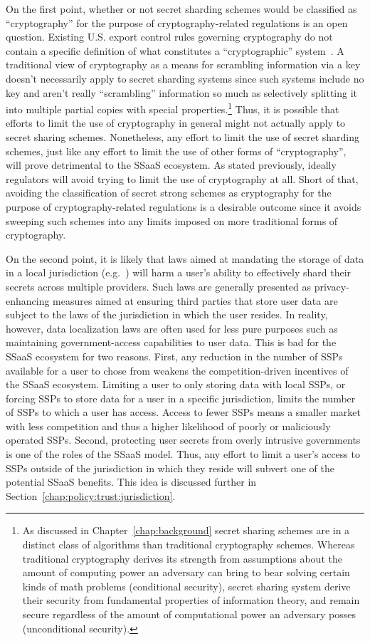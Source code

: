 On the first point, whether or not secret sharding schemes would be
classified as ``cryptography'' for the purpose of cryptography-related
regulations is an open question. Existing U.S. export control rules
governing cryptography do not contain a specific definition of what
constitutes a ``cryptographic'' system~\cite{bis-encrypted}. A
traditional view of cryptography as a means for scrambling information
via a key doesn't necessarily apply to secret sharding systems since
such systems include no key and aren't really ``scrambling''
information so much as selectively splitting it into multiple partial
copies with special properties.\footnote{As discussed in
  Chapter~\ref{chap:background} secret sharing schemes are in a
  distinct class of algorithms than traditional cryptography
  schemes. Whereas traditional cryptography derives its strength from
  assumptions about the amount of computing power an adversary can
  bring to bear solving certain kinds of math problems (conditional
  security), secret sharing system derive their security from
  fundamental properties of information theory, and remain secure
  regardless of the amount of computational power an adversary posses
  (unconditional security).} Thus, it is possible that efforts to
limit the use of cryptography in general might not actually apply to
secret sharing schemes. Nonetheless, any effort to limit the use of
secret sharding schemes, just like any effort to limit the use of
other forms of ``cryptography'', will prove detrimental to the SSaaS
ecosystem. As stated previously, ideally regulators will avoid trying
to limit the use of cryptography at all. Short of that, avoiding the
classification of secret strong schemes as cryptography for the
purpose of cryptography-related regulations is a desirable outcome
since it avoids sweeping such schemes into any limits imposed on more
traditional forms of cryptography.

On the second point, it is likely that laws aimed at mandating the
storage of data in a local jurisdiction (e.g.~\cite{dergacheva2015})
will harm a user's ability to effectively shard their secrets across
multiple providers. Such laws are generally presented as
privacy-enhancing measures aimed at ensuring third parties that store
user data are subject to the laws of the jurisdiction in which the
user resides. In reality, however, data localization laws are often
used for less pure purposes such as maintaining government-access
capabilities to user data. This is bad for the SSaaS ecosystem for two
reasons. First, any reduction in the number of SSPs available for a
user to chose from weakens the competition-driven incentives of the
SSaaS ecosystem. Limiting a user to only storing data with local SSPs,
or forcing SSPs to store data for a user in a specific jurisdiction,
limits the number of SSPs to which a user has access.  Access to fewer
SSPs means a smaller market with less competition and thus a higher
likelihood of poorly or maliciously operated SSPs. Second, protecting
user secrets from overly intrusive governments is one of the roles of
the SSaaS model. Thus, any effort to limit a user's access to SSPs
outside of the jurisdiction in which they reside will subvert one of
the potential SSaaS benefits. This idea is discussed further in
Section~\ref{chap:policy:trust:jurisdiction}.

